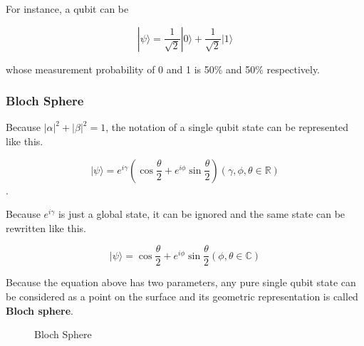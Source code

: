  For instance, a qubit can be 
 
 \begin{equation}
	|\psi\rangle = \frac{1}{\sqrt{2}}|0\rangle + \frac{1}{\sqrt{2}}|1\rangle \tag{1}
\end{equation}

 whose measurement probability of 0 and 1 is 50\% and 50\% respectively.

\subsubsection{Bloch Sphere}
Because $|\alpha|^2 + |\beta|^2 = 1$, the notation of a single qubit state can be represented like this.

\begin{equation}
|\psi\rangle = e^{i\gamma} (\cos{\frac{\theta}{2}} + e^{i\phi} \sin{\frac{\theta}{2}}) (\gamma, \phi, \theta \in \mathbb{R})
\end{equation}.

Because $e^{i\gamma}$ is just a global state, it can be ignored and the same state can be rewritten like this.

\begin{equation}
 |\psi\rangle =  \cos{\frac{\theta}{2}} + e^{i\phi} \sin{\frac{\theta}{2}} (\phi, \theta \in \mathbb{C})
\end{equation}

Because the equation above has two parameters,  any pure single qubit state can be considered as a point on the surface and its geometric representation is called \textbf{Bloch sphere}.

\begin{figure}[ht]
  \centering
    
\newpage
\caption{Bloch Sphere}
\end{figure}

